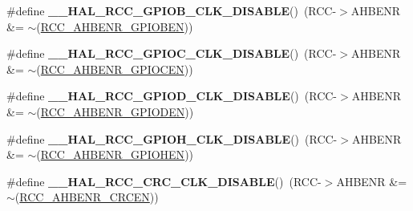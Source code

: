 \begin{DoxyCompactItemize}
\item 
\hypertarget{group___r_c_c___peripheral___clock___enable___disable_ga60be1be419b57dafbbb93df67d68a424}{\#define {\bfseries \-\_\-\-\_\-\-H\-A\-L\-\_\-\-R\-C\-C\-\_\-\-G\-P\-I\-O\-B\-\_\-\-C\-L\-K\-\_\-\-D\-I\-S\-A\-B\-L\-E}()~(R\-C\-C-\/$>$A\-H\-B\-E\-N\-R \&= $\sim$(\hyperlink{group___peripheral___registers___bits___definition_gab7995351a5b0545e8cd86a228d97dcec}{R\-C\-C\-\_\-\-A\-H\-B\-E\-N\-R\-\_\-\-G\-P\-I\-O\-B\-E\-N}))}\label{group___r_c_c___peripheral___clock___enable___disable_ga60be1be419b57dafbbb93df67d68a424}

\item 
\hypertarget{group___r_c_c___peripheral___clock___enable___disable_ga0fc90c25d35f9b5b5f66961505de1cd4}{\#define {\bfseries \-\_\-\-\_\-\-H\-A\-L\-\_\-\-R\-C\-C\-\_\-\-G\-P\-I\-O\-C\-\_\-\-C\-L\-K\-\_\-\-D\-I\-S\-A\-B\-L\-E}()~(R\-C\-C-\/$>$A\-H\-B\-E\-N\-R \&= $\sim$(\hyperlink{group___peripheral___registers___bits___definition_ga7e5c4504b7adbb13372e7536123a756b}{R\-C\-C\-\_\-\-A\-H\-B\-E\-N\-R\-\_\-\-G\-P\-I\-O\-C\-E\-N}))}\label{group___r_c_c___peripheral___clock___enable___disable_ga0fc90c25d35f9b5b5f66961505de1cd4}

\item 
\hypertarget{group___r_c_c___peripheral___clock___enable___disable_gaeaefe364dafdc0c22353969595421422}{\#define {\bfseries \-\_\-\-\_\-\-H\-A\-L\-\_\-\-R\-C\-C\-\_\-\-G\-P\-I\-O\-D\-\_\-\-C\-L\-K\-\_\-\-D\-I\-S\-A\-B\-L\-E}()~(R\-C\-C-\/$>$A\-H\-B\-E\-N\-R \&= $\sim$(\hyperlink{group___peripheral___registers___bits___definition_ga07b7f4fd011c26e100682157c4a59890}{R\-C\-C\-\_\-\-A\-H\-B\-E\-N\-R\-\_\-\-G\-P\-I\-O\-D\-E\-N}))}\label{group___r_c_c___peripheral___clock___enable___disable_gaeaefe364dafdc0c22353969595421422}

\item 
\hypertarget{group___r_c_c___peripheral___clock___enable___disable_ga1eb7dd0a520cef518fb624bf7117b7e1}{\#define {\bfseries \-\_\-\-\_\-\-H\-A\-L\-\_\-\-R\-C\-C\-\_\-\-G\-P\-I\-O\-H\-\_\-\-C\-L\-K\-\_\-\-D\-I\-S\-A\-B\-L\-E}()~(R\-C\-C-\/$>$A\-H\-B\-E\-N\-R \&= $\sim$(\hyperlink{group___peripheral___registers___bits___definition_ga65735e58928263f9171aa04ce1784843}{R\-C\-C\-\_\-\-A\-H\-B\-E\-N\-R\-\_\-\-G\-P\-I\-O\-H\-E\-N}))}\label{group___r_c_c___peripheral___clock___enable___disable_ga1eb7dd0a520cef518fb624bf7117b7e1}

\item 
\hypertarget{group___r_c_c___peripheral___clock___enable___disable_ga170a30954a78a81a8f9b381378e0c9af}{\#define {\bfseries \-\_\-\-\_\-\-H\-A\-L\-\_\-\-R\-C\-C\-\_\-\-C\-R\-C\-\_\-\-C\-L\-K\-\_\-\-D\-I\-S\-A\-B\-L\-E}()~(R\-C\-C-\/$>$A\-H\-B\-E\-N\-R \&= $\sim$(\hyperlink{group___peripheral___registers___bits___definition_gade3ee302bf659a2bfbf75e1a00630242}{R\-C\-C\-\_\-\-A\-H\-B\-E\-N\-R\-\_\-\-C\-R\-C\-E\-N}))}\label{group___r_c_c___peripheral___clock___enable___disable_ga170a30954a78a81a8f9b381378e0c9af}


\end{DoxyCompactItemize}
